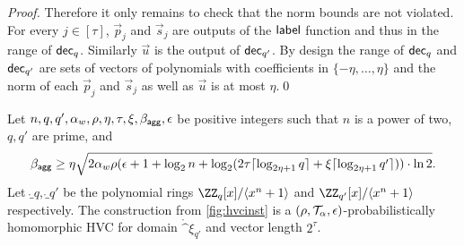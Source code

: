 \begin{proof}
Therefore it only remains to check that the norm bounds are not violated. For every $j\in[\tau]$, $\vec{p}_j$ and $\vec{s}_j$ are outputs of the $\mathsf{label}$ function and thus in the range of $\mathsf{dec}_q$.
Similarly $\vec{u}$ is the output of $\mathsf{dec}_{q'}$.
By design the range of $\mathsf{dec}_q$ and $\mathsf{dec}_{q'}$ are sets of vectors of polynomials with coefficients in $\{-\eta,\dots,\eta\}$ and the norm of each $\vec{p}_j$ and $\vec{s}_j$ as well as $\vec{u}$ is at most $\eta$.\qed
\end{proof}

\begin{lemma}\label{lem:hvcprobhom}
  Let $n,q,q',\alpha_w,\rho,\eta,\tau,\xi,\beta_{\mathsf{agg}},\epsilon$ be positive integers such that $n$ is a power of two, $q,q'$ are prime, and \[\beta_{\mathsf{agg}} \geq \eta\sqrt{2\alpha_w\rho(\epsilon+1+\log_2 n + \log_2(2\tau \lceil\log_{2\eta+1}q\rceil + \xi\lceil\log_{2\eta+1}q'\rceil))\cdot\ln2}.\]
  Let $\ring_q,\ring_{q'}$ be the polynomial rings $\ZZ_q[x]/\langle x^n+1\rangle$ and $\ZZ_{q'}[x]/\langle x^n+1\rangle$ respectively.
  The construction from \autoref{fig:hvcinst} is a $(\rho,\mathcal{T}_\alpha,\epsilon)$-probabilistically homomorphic HVC for domain $\ring^\xi_{q'}$ and vector length $2^\tau$.
\end{lemma}
